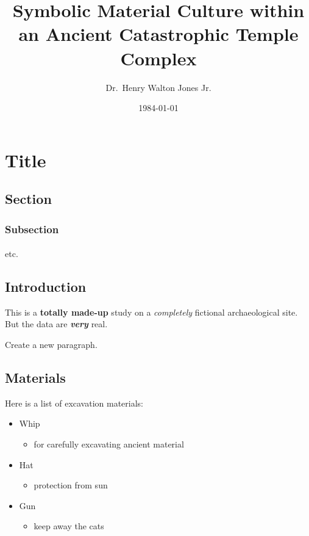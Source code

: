 \documentclass[
  letterpaper,
  DIV=11,
  numbers=noendperiod]{scrartcl}
\title{Symbolic Material Culture within an Ancient Catastrophic Temple
Complex}
\author{Dr.~Henry Walton Jones Jr.}
\date{1984-01-01}
\makeatletter
\let\oldparagraph\paragraph
\renewcommand{\paragraph}{
    \@ifstar
      \xxxParagraphStar
      \xxxParagraphNoStar
  }
\newcommand{\xxxParagraphStar}[1]{\oldparagraph*{#1}\mbox{}}
\newcommand{\xxxParagraphNoStar}[1]{\oldparagraph{#1}\mbox{}}
\providecommand{\tightlist}{%
  \setlength{\itemsep}{0pt}\setlength{\parskip}{0pt}}\usepackage{longtable,booktabs,array}
\makeatother
\begin{document}
\maketitle

\section{Title}\label{title}

\subsection{Section}\label{section}

\subsubsection{Subsection}\label{subsection}

\paragraph{etc.}\label{etc.}

\subsection{Introduction}\label{introduction}

This is a \textbf{totally made-up} study on a \emph{completely}
fictional archaeological site.\\
But the data are \textbf{\emph{very}} real.

Create a new paragraph.

\subsection{Materials}\label{materials}

Here is a list of excavation materials:

\begin{itemize}
\tightlist
\item
  Whip

  \begin{itemize}
  \tightlist
  \item
    for carefully excavating ancient material
  \end{itemize}
\item
  Hat

  \begin{itemize}
  \tightlist
  \item
    protection from sun
  \end{itemize}
\item
  Gun

  \begin{itemize}
  \tightlist
  \item
    keep away the cats
  \end{itemize}
\end{itemize}
\end{document}
